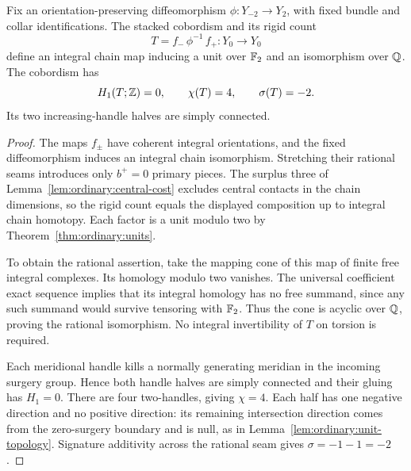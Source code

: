 \begin{corollary}\label{cor:ordinary:bridge}
Fix an orientation-preserving diffeomorphism
$\phi:Y_{-2}\longrightarrow Y_2$, with fixed bundle and collar
identifications.  The stacked cobordism and its rigid count
\begin{equation}\label{eq:ordinary:bridge}
 T=f_-\,\phi^{-1}\,f_+:Y_0\longrightarrow Y_0
\end{equation}
define an integral chain map inducing a unit over $\mathbb F_2$ and
an isomorphism over $\mathbb Q$.  The cobordism has
\begin{equation}\label{eq:ordinary:bridge-topology}
 H_1(T;\mathbb Z)=0,\qquad \chi(T)=4,\qquad \sigma(T)=-2.
\end{equation}
Its two increasing-handle halves are simply connected.
\end{corollary}
\begin{proof}
The maps $f_\pm$ have coherent integral orientations,
and the fixed diffeomorphism induces an integral
chain isomorphism.  Stretching their rational seams
introduces only $b^+=0$ primary pieces.  The surplus
three of Lemma~\ref{lem:ordinary:central-cost}
excludes central contacts in the chain dimensions,
so the rigid count equals the displayed composition
up to integral chain homotopy.  Each factor is a
unit modulo two by Theorem~\ref{thm:ordinary:units}.

To obtain the rational assertion, take the mapping
cone of this map of finite free integral complexes.
Its homology modulo two vanishes.  The universal
coefficient exact sequence implies that its
integral homology has no free summand, since any
such summand would survive tensoring with $\mathbb F_2$.
Thus the cone is acyclic over $\mathbb Q$, proving the
rational isomorphism.  No integral invertibility
of $T$ on torsion is required.

Each meridional handle kills a normally generating
meridian in the incoming surgery group.  Hence
both handle halves are simply connected and their
gluing has $H_1=0$.  There are four two-handles,
giving $\chi=4$.  Each half has one negative
direction and no positive direction: its remaining
intersection direction comes from the zero-surgery
boundary and is null, as in
Lemma~\ref{lem:ordinary:unit-topology}.  Signature
additivity across the rational seam gives
$\sigma=-1-1=-2$.
\end{proof}
